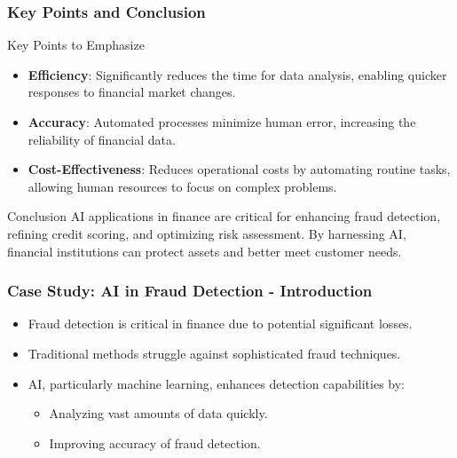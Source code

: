 \documentclass[aspectratio=169]{beamer}
\begin{document}
\begin{frame}[fragile]
    \frametitle{Key Points and Conclusion}
    \begin{block}{Key Points to Emphasize}
        \begin{itemize}
            \item \textbf{Efficiency}: Significantly reduces the time for data analysis, enabling quicker responses to financial market changes.
            \item \textbf{Accuracy}: Automated processes minimize human error, increasing the reliability of financial data.
            \item \textbf{Cost-Effectiveness}: Reduces operational costs by automating routine tasks, allowing human resources to focus on complex problems.
        \end{itemize}
    \end{block}

    \begin{block}{Conclusion}
        AI applications in finance are critical for enhancing fraud detection, refining credit scoring, and optimizing risk assessment. By harnessing AI, financial institutions can protect assets and better meet customer needs.
    \end{block}
\end{frame}

\begin{frame}[fragile]
    \frametitle{Case Study: AI in Fraud Detection - Introduction}
    \begin{itemize}
        \item Fraud detection is critical in finance due to potential significant losses.
        \item Traditional methods struggle against sophisticated fraud techniques.
        \item AI, particularly machine learning, enhances detection capabilities by:
        \begin{itemize}
            \item Analyzing vast amounts of data quickly.
            \item Improving accuracy of fraud detection.
        \end{itemize}
    \end{itemize}
\end{frame}
\end{document}
